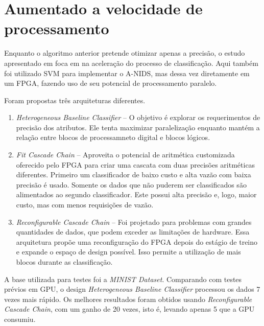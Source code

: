 \section{Aumentado a velocidade de processamento}
Enquanto o algoritmo anterior pretende otimizar apenas a precisão, o estudo apresentado em \cite{papadonikolakis12}
foca em na aceleração do processo de classificação. Aqui também foi utilizado SVM para implementar o A-NIDS, mas dessa
vez diretamente em um FPGA, fazendo uso de seu potencial de processamento paralelo.
\par Foram propostas três arquiteturas diferentes.
\begin{enumerate}
    \item \textit{Heterogeneous Baseline Classifier} -- O objetivo é explorar os requerimentos de precisão dos atributos. Ele
    tenta maximizar paralelização enquanto mantém a relação entre blocos de processamneto digital e blocos lógicos.
    \item \textit{Fit Cascade Chain} -- Aproveita o potencial de aritmética customizada oferecido pelo FPGA para criar uma
    cascata com duas precisões aritméticas diferentes. Primeiro um classificador de baixo custo e alta vazão com baixa
    precisão é usado. Somente os dados que não puderem ser classificados são alimentados ao segundo classificador. Este
    possui alta precisão e, logo, maior custo, mas com menos requisições de vazão.
    \item \textit{Reconfigurable Cascade Chain} -- Foi projetado para problemas com grandes quantidades de dados, que podem
    exceder as limitações de hardware. Essa arquitetura propõe uma reconfiguração do FPGA depois do estágio de treino e
    expande o espaço de design possível. Isso permite a utilização de mais blocos durante as classificação.
\end{enumerate}
\par A base utilizada para testes foi a \textit{MINIST Dataset}. Comparando com testes prévios em GPU, o design
\textit{Heterogeneous Baseline Classifier} processou os dados 7 vezes mais rápido. Os melhores resultados foram
obtidos usando \textit{Reconfigurable Cascade Chain}, com um ganho de 20 vezes, isto é, levando apenas 5%
que a GPU consumiu.